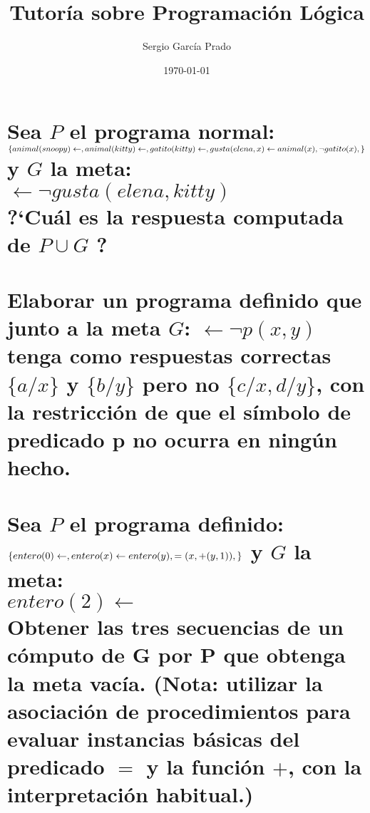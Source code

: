 \documentclass[10pt, a4paper,spanish]{article}
\title{\vspace{-15mm}\fontsize{24.88pt}{10pt}\textbf{Tutoría sobre Programación Lógica}} %
\author{Sergio García Prado}
\date{\today}
\begin{document}
	\maketitle %

	\thispagestyle{fancy} %


	\section{Sea $P$ el programa normal: \\
		$\{ \\
		animal(snoopy) \gets, \\
		animal(kitty) \gets, \\
		gatito(kitty) \gets, \\
		gusta(elena,x) \gets animal(x), \neg gatito(x), \\
		\}\\$
		y $G$ la meta: \\
		$\gets \neg gusta(elena,kitty)$\\
		?`Cuál es la respuesta computada de $P \cup {G}$ ?}

		\paragraph{}


	\section{Elaborar un programa definido que junto a la meta $G$: $\gets \neg p(x,y)$ tenga como respuestas correctas $\{ a / x \}$ y $\{b / y\}$ pero no $\{c / x, d / y\}$, con la restricción de que el símbolo de predicado p no ocurra en ningún hecho.}

		\paragraph{}


	\section{Sea $P$ el programa definido: \\
		$\{\\
		entero(0) \gets ,\\
		entero(x) \gets entero(y), =(x, +(y,1)),\\
		\}\\$
		y $G$ la meta: \\
		$entero(2) \gets$\\
		Obtener las tres secuencias de un cómputo de G por P que obtenga la meta vacía. (Nota: utilizar la asociación de procedimientos para evaluar instancias básicas del predicado $=$ y la función $+$, con la interpretación habitual.)}

		\paragraph{}
\end{document}
